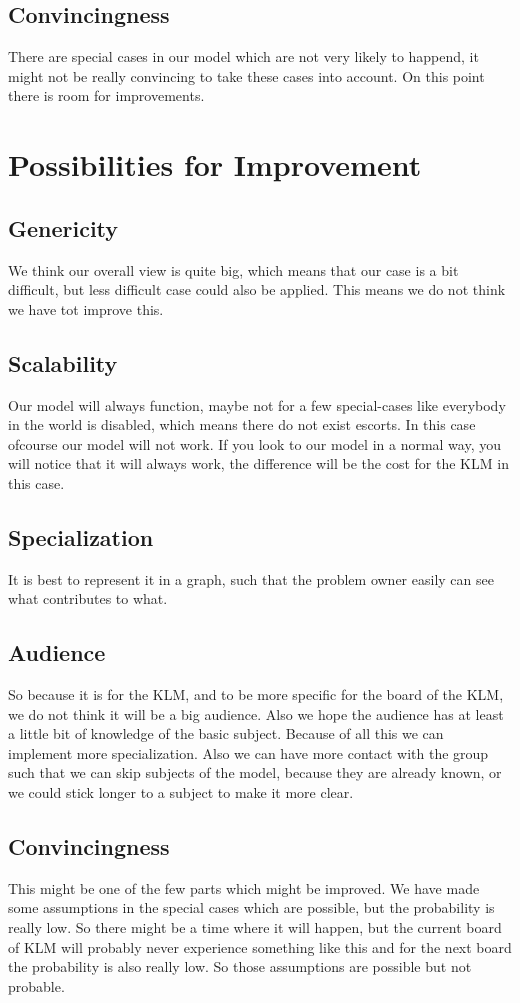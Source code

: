 \documentclass[a4paper, 11pt, notitlepage]{report}
\begin{document}
\section{Convincingness}
There are special cases in our model which are not very likely to happend, it might not be really convincing to take these cases into account. On this point there is room for improvements.
\chapter{Possibilities for Improvement}
\section{Genericity}
    We think our overall view is quite big, which means that our case is a bit difficult, but less difficult case could also be applied. This means we do not think we have tot improve this.
\section{Scalability}
    Our model will always function, maybe not for a few special-cases like everybody in the world is disabled, which means there do not exist escorts. In this case ofcourse our model will not work. If you look to our model in a normal way, you will notice that it will always work, the difference will be the cost for the KLM in this case.
\section{Specialization}
    It is best to represent it in a graph, such that the problem owner easily can see what contributes to what.
\section{Audience}
    So because it is for the KLM, and to be more specific for the board of the KLM, we do not think it will be a big audience. Also we hope the audience has at least a little bit of knowledge of the basic subject. Because of all this we can implement more specialization. Also we can have more contact with the group such that we can skip subjects of the model, because they are already known, or we could stick longer to a subject to make it more clear.
\section{Convincingness}
    This might be one of the few parts which might be improved. We have made some assumptions in the special cases which are possible, but the probability is really low. So there might be a time where it will happen, but the current board of KLM will probably never experience something like this and for the next board the probability is also really low. So those assumptions are possible but not probable.
\end{document}
